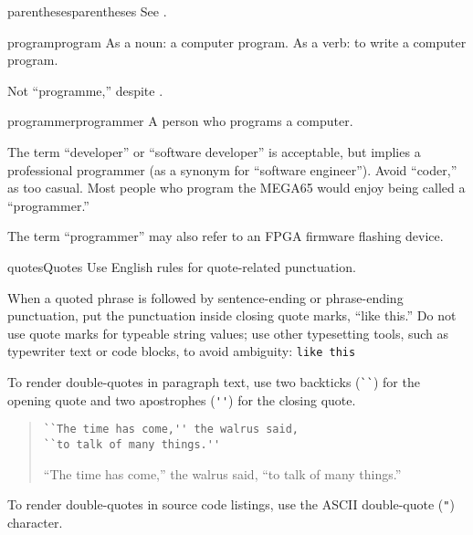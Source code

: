 \begin{sgentry}{parentheses}{parentheses}
    See .
\end{sgentry}

\begin{sgentry}{program}{program}
    As a noun: a computer program. As a verb: to write a computer program.

    Not ``programme,'' despite .
\end{sgentry}

\begin{sgentry}{programmer}{programmer}
    A person who programs a computer.

    The term ``developer'' or ``software developer'' is acceptable, but implies a professional programmer (as a synonym for ``software engineer''). Avoid ``coder,'' as too casual. Most people who program the MEGA65 would enjoy being called a ``programmer.''

    The term ``programmer'' may also refer to an FPGA firmware flashing device.
\end{sgentry}

\begin{sgentry}{quotes}{Quotes}
    Use English rules for quote-related punctuation.

    When a quoted phrase is followed by sentence-ending or phrase-ending punctuation, put the punctuation inside closing quote marks, ``like this.'' Do not use quote marks for typeable string values; use other typesetting tools, such as typewriter text or code blocks, to avoid ambiguity: \texttt{like this}

    To render double-quotes in paragraph text, use two backticks (\verb|``|) for the opening quote and two apostrophes (\verb|''|) for the closing quote.

    \begin{quote}
        \begin{verbatim}
``The time has come,'' the walrus said,
``to talk of many things.''
        \end{verbatim}

        \hrulefill

        ``The time has come,'' the walrus said, ``to talk of many things.''
    \end{quote}

    To render double-quotes in source code listings, use the ASCII double-quote (\verb|"|) character.
\end{sgentry}

